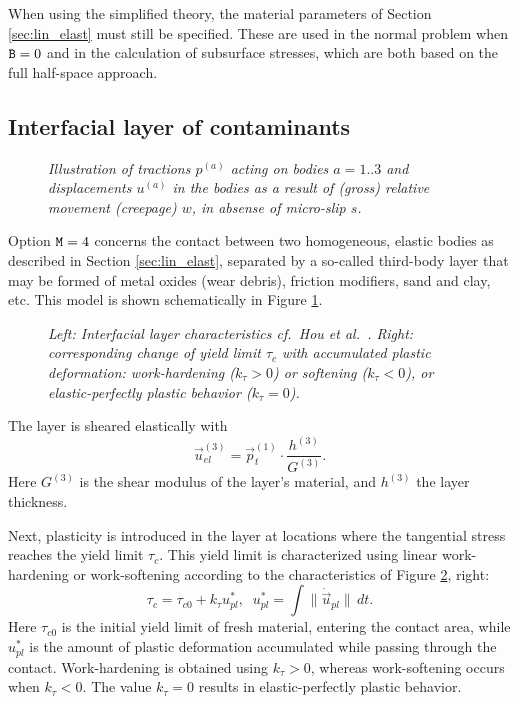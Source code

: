 \documentclass[12pt]{report}
\begin{document}
When using the simplified theory, the material parameters of Section
\ref{sec:lin_elast} must still be specified. These are used in the normal
problem when ${\tt B}=0$ and in the calculation of subsurface stresses,
which are both based on the full half-space approach.

\subsection{Interfacial layer of contaminants}
\label{sec:intfc_layer}

\begin{figure}[bt]
\centering
{}
\caption{\em Illustration of tractions $p^{(a)}$ acting on bodies $a=1..3$
        and displacements $u^{(a)}$ in the bodies as a result of (gross)
        relative movement (creepage) $w$, in absense of micro-slip $s$.}
\label{fig:intfc_layer}
\end{figure}

Option ${\tt M}=4$ concerns the contact between two homogeneous, elastic
bodies as described in Section \ref{sec:lin_elast}, separated by a
so-called third-body layer that may be formed of metal oxides (wear
debris), friction modifiers, sand and clay, etc. This model is shown
schematically in Figure \ref{fig:intfc_layer}.

\begin{figure}[bt]
\centering
{}
\caption{\em Left: Interfacial layer characteristics cf.\ Hou et al.\ 
        \cite{Hou1997}. Right: corresponding change of yield limit
        $\tau_c$ with accumulated plastic deformation: work-hardening
        ($k_\tau>0$) or softening ($k_\tau<0$), or elastic-perfectly
        plastic behavior ($k_\tau=0$).}
\label{fig:hou_schm}
\end{figure}

The layer is sheared elastically with
\begin{equation}
   \vec{u}_{el}^{(3)} = \vec{p}_t^{(1)} \cdot \frac{h^{(3)} }{ G^{(3)} } .
\end{equation}
Here $G^{(3)}$ is the shear modulus of the layer's material, and $h^{(3)}$
the layer thickness.

Next, plasticity is introduced in the layer at locations where the tangential
stress reaches the yield limit $\tau_c$. This yield limit is characterized
using linear work-hardening or work-softening according to the
characteristics of Figure \ref{fig:hou_schm}, right:
\begin{equation}
        \tau_c = \tau_{c0} + k_\tau u^*_{pl} , \;\;
        u^*_{pl} = \int \| \dot{\vec{u}}_{pl} \| \,dt .
\end{equation}
Here $\tau_{c0}$ is the initial yield limit of fresh material, entering the
contact area, while $u^*_{pl}$ is the amount of plastic deformation
accumulated while passing through the contact. Work-hardening is obtained
using $k_\tau>0$, whereas work-softening occurs when $k_\tau<0$. The value
$k_\tau=0$ results in elastic-perfectly plastic behavior.
\end{document}
